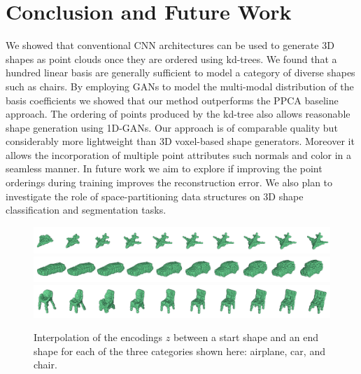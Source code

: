 \section{Conclusion and Future Work} \label{sec:conclusion}
We showed that conventional CNN architectures can be used to generate 3D shapes as point clouds once they are ordered using kd-trees.
We found that a hundred linear basis are generally sufficient to model a category of diverse shapes such as chairs.
By employing GANs to model the multi-modal distribution of the basis coefficients we showed that our method outperforms the PPCA baseline approach.
The ordering of points produced by the kd-tree also allows reasonable shape generation using 1D-GANs.
Our approach is of comparable quality but considerably more lightweight than 3D voxel-based shape generators.
Moreover it allows the incorporation of multiple point attributes such normals and color in a seamless manner.
In future work we aim to explore if improving the point orderings during training improves the reconstruction error.
We also plan to investigate the role of space-partitioning data structures on 3D shape classification and segmentation tasks.
\begin{figure}[h]
\includegraphics[width=1.0\linewidth]{PCAGAN/images/airplane_interpolation2.png}
\includegraphics[width=1.0\linewidth]{PCAGAN/images/car_interpolation2.png}
\includegraphics[width=1.0\linewidth]{PCAGAN/images/chair_interpolation2.png}
\vspace{-16pt}
\caption{\small \label{fig:interpolation} Interpolation of the encodings $z$ between a start shape and an end shape for each of the three categories shown here: airplane, car, and chair.}
\vspace{-12pt}
\end{figure}
